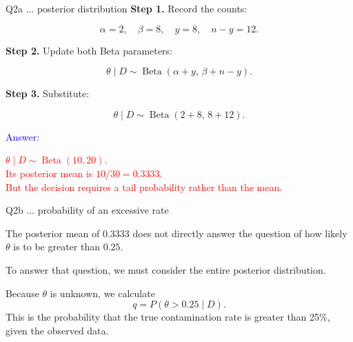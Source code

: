 \documentclass[aspectratio=43,10pt]{beamer}
\newcommand{\answer}[1]{\textcolor{red}{#1}}
\begin{document}
\begin{frame}{}
\begin{block}{Q2a ... posterior distribution}
  \textbf{Step 1.} Record the counts:

  \[
  \alpha=2,\quad \beta=8,\quad y=8,\quad n-y=12.
  \]
  
  \pause

  \textbf{Step 2.} Update both Beta parameters:

  \[
  \theta\mid D\sim
  \operatorname{Beta}(\alpha+y,\,\beta+n-y).
  \]
  
  \pause

  \textbf{Step 3.} Substitute:

  \[
  \theta\mid D\sim
  \operatorname{Beta}(2+8,\,8+12).
  \]

  \textcolor{blue}{Answer:}

  \answer{
    $\theta\mid D\sim\operatorname{Beta}(10,20)$.\\
    Its posterior mean is $10/30=0.3333$.\\
    But the decision requires a tail probability rather than the mean.
  }
\end{block}
\end{frame}


\begin{frame}{}
\begin{block}{Q2b ... probability of an excessive rate}

The posterior mean of $0.3333$ does not directly answer the question of how
likely $\theta$ is to be greater than $0.25$.

To answer that question, we must consider the entire posterior distribution.

\pause

Because $\theta$ is unknown, we calculate
\[
q=P(\theta>0.25\mid D).
\]
This is the probability that the true contamination rate is greater than 25\%,
given the observed data.
\end{block}
\end{frame}
\end{document}
